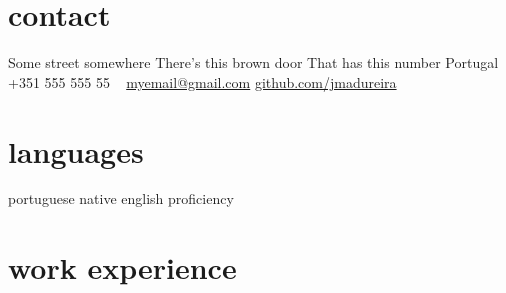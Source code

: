 \documentclass[]{friggeri-cv}
\begin{document}

\begin{aside}
\section{contact}
Some street somewhere
There's this brown door
That has this number
Portugal
~
+351 555 555 55
~
\href{mailto:myemail@gmail.com}{myemail@gmail.com}
\href{https://github.com/jmadureira}{github.com/jmadureira}
\section{languages}
portuguese native
english proficiency
\end{aside}


\section{work experience}
\end{document}
